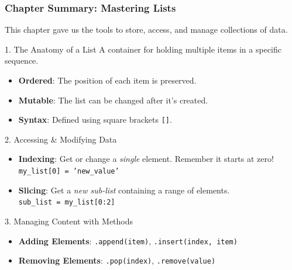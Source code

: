 \documentclass{beamer}
\begin{document}
\begin{frame}[fragile]
    \frametitle{Chapter Summary: Mastering Lists}
    
    This chapter gave us the tools to store, access, and manage collections of data.
    
    \begin{block}{1. The Anatomy of a List}
        A container for holding multiple items in a specific sequence.
        \begin{itemize}
            \item \textbf{Ordered}: The position of each item is preserved.
            \item \textbf{Mutable}: The list can be changed after it's created.
            \item \textbf{Syntax}: Defined using square brackets \texttt{[]}.
        \end{itemize}
    \end{block}
    
    \pause
    
    \begin{block}{2. Accessing \& Modifying Data}
        \begin{itemize}
            \item \textbf{Indexing}: Get or change a \textit{single} element. Remember it starts at zero! \\ \texttt{my\_list[0] = 'new\_value'}
            \item \textbf{Slicing}: Get a \textit{new sub-list} containing a range of elements. \\ \texttt{sub\_list = my\_list[0:2]}
        \end{itemize}
    \end{block}
    
    \pause
    
    \begin{block}{3. Managing Content with Methods}
        \begin{itemize}
            \item \textbf{Adding Elements}: \texttt{.append(item)}, \texttt{.insert(index, item)}
            \item \textbf{Removing Elements}: \texttt{.pop(index)}, \texttt{.remove(value)}
        \end{itemize}
    \end{block}
    
\end{frame}
\end{document}
